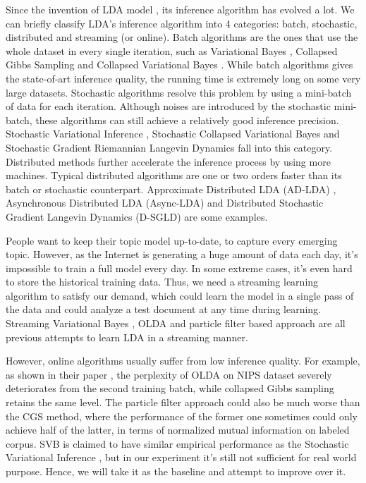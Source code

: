 \documentclass{article} %
\begin{document}
Since the invention of LDA model \cite{blei2003latent}, its inference algorithm has evolved a lot. We can briefly classify LDA's inference algorithm into 4 categories: batch, stochastic, distributed and streaming (or online). Batch algorithms are the ones that use the whole dataset in every single iteration, such as Variational Bayes \cite{blei2003latent}, Collapsed Gibbs Sampling \cite{griffiths2004finding} and Collapsed Variational Bayes \cite{teh2006collapsed}. While batch algorithms gives the state-of-art inference quality, the running time is extremely long on some very large datasets. Stochastic algorithms resolve this problem by using a mini-batch of data for each iteration. Although noises are introduced by the stochastic mini-batch, these algorithms can still achieve a relatively good inference precision. Stochastic Variational Inference \cite{hoffman2013stochastic}, Stochastic Collapsed Variational Bayes \cite{foulds2013stochastic} and Stochastic Gradient Riemannian Langevin Dynamics \cite{patterson2013stochastic} fall into this category. Distributed methods further accelerate the inference process by using more machines. Typical distributed algorithms are one or two orders faster than its batch or stochastic counterpart. Approximate Distributed LDA (AD-LDA) \cite{newman2007distributed}, Asynchronous Distributed LDA (Async-LDA) \cite{newman2009distributed} and Distributed Stochastic Gradient Langevin
Dynamics (D-SGLD) \cite{ahn2014distributed} are some examples. 

People want to keep their topic model up-to-date, to capture every emerging topic. However, as the Internet is generating a huge amount of data each day, it's impossible to train a full model every day. In some extreme cases, it's even hard to store the historical training data. Thus, we need a streaming learning algorithm to satisfy our demand, which could learn the model in a single pass of the data and could analyze a test document at any time during learning. Streaming Variational Bayes \cite{broderick2013streaming}, OLDA \cite{alsumait2008line} and particle filter based approach \cite{canini2009online} are all previous attempts to learn LDA in a streaming manner.

However, online algorithms usually suffer from low inference quality. For example, as shown in their paper \cite{alsumait2008line}, the perplexity of OLDA on NIPS dataset severely deteriorates from the second training batch, while collapsed Gibbs sampling retains the same level. The particle filter approach \cite{canini2009online} could also be much worse than the CGS method, where the performance of the former one sometimes could only achieve half of the latter, in terms of normalized mutual information on labeled corpus. SVB is claimed to have similar empirical performance as the Stochastic Variational Inference \cite{broderick2013streaming}, but in our experiment it's still not sufficient for real world purpose. Hence, we will take it as the baseline and attempt to improve over it.
\end{document}
